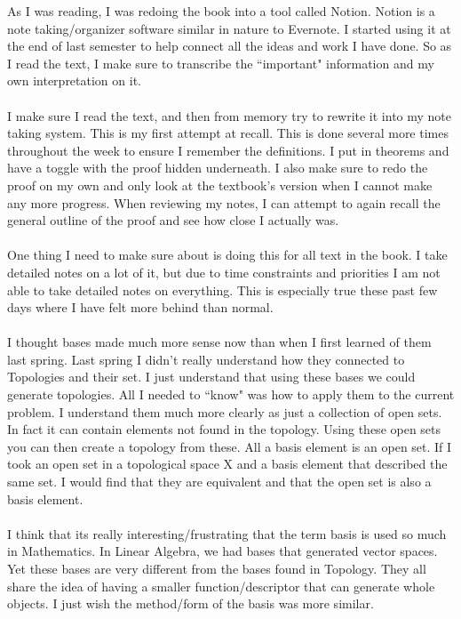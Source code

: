 \documentclass[10pt]{article}
\begin{document}
As I was reading, I was redoing the book into a tool called Notion. Notion is a note taking/organizer software similar in nature to Evernote. I started using it at the end of last semester to help connect all the ideas and work I have done. So as I read the text, I make sure to transcribe the ``important" information and my own interpretation on it.\\
\\
 I make sure I read the text, and then from memory try to rewrite it into my note taking system. This is my first attempt at recall. This is done several more times throughout the week to ensure I remember the definitions. I put in theorems and have a toggle with the proof hidden underneath. I also make sure to redo the proof on my own and only look at the textbook's version when I cannot make any more progress. When reviewing my notes, I can attempt to again recall the general outline of the proof and see how close I actually was. \\
\\
One thing I need to make sure about is doing this for all text in the book. I take detailed notes on a lot of it, but due to time constraints and priorities I am not able to take detailed notes on everything. This is especially true these past few days where I have felt more behind than normal.\\
\\
I thought bases made much more sense now than when I first learned of them last spring. Last spring I didn't really understand how they connected to Topologies and their set. I just understand that using these bases we could generate topologies. All I needed to ``know" was how to apply them to the current problem. I understand them much more clearly as just a collection of open sets. In fact it can contain elements not found in the topology. Using these open sets you can then create a topology from these. All a basis element is an open set. If I took an open set in a topological space X and a basis element that described the same set. I would find that they are equivalent and that the open set is also a basis element.\\
\\
 I think that its really interesting/frustrating that the term basis is used so much in Mathematics. In Linear Algebra, we had bases that generated vector spaces. Yet these bases are very different from the bases found in Topology. They all share the idea of having a smaller function/descriptor that can generate whole objects. I just wish the method/form of the basis was more similar. \\
\end{document}
